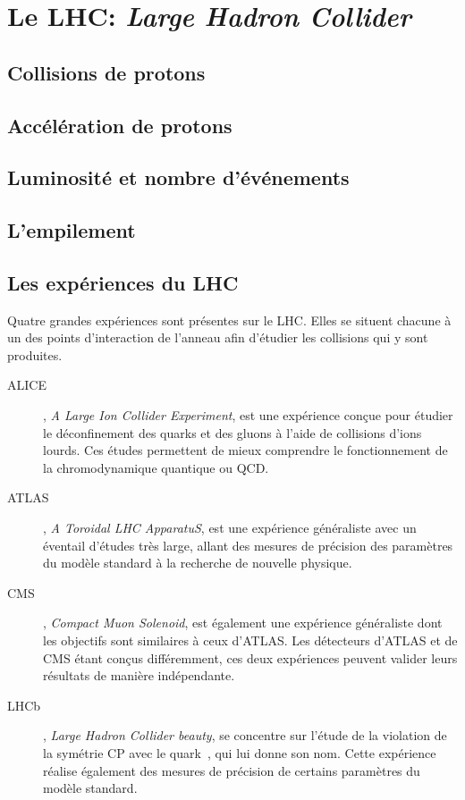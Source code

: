 \section{Le LHC: \emph{Large Hadron Collider}}\label{chapter-LHC-section-LHC}

\subsection{Collisions de protons}\label{chapter-LHC-section-LHC-subsec-pp_collisions}

\subsection{Accélération de protons}\label{chapter-LHC-section-LHC-subsec-pp_acceleration}

\subsection{Luminosité et nombre d'événements}\label{chapter-LHC-section-LHC-subsec-lumi}

\subsection{L'empilement}\label{chapter-LHC-section-LHC-subsec-PU}

\subsection{Les expériences du LHC}\label{chapter-LHC-section-LHC-subsec-experiments}
Quatre grandes expériences sont présentes sur le LHC. Elles se situent chacune à un des points d'interaction de l'anneau afin d'étudier les collisions qui y sont produites.
\begin{description}
\item[ALICE]\cite{alice_paper}, \emph{A Large Ion Collider Experiment}, est une expérience conçue pour étudier le déconfinement des quarks et des gluons à l'aide de collisions d'ions lourds. Ces études permettent de mieux comprendre le fonctionnement de la chromodynamique quantique ou QCD.
\item[ATLAS]\cite{atlas_paper}, \emph{A Toroidal LHC ApparatuS}, est une expérience généraliste avec un éventail d'études très large, allant des mesures de précision des paramètres du modèle standard à la recherche de nouvelle physique.
\item[CMS]\cite{cms_paper}, \emph{Compact Muon Solenoid}, est également une expérience généraliste dont les objectifs sont similaires à ceux d'ATLAS. Les détecteurs d'ATLAS et de CMS étant conçus différemment, ces deux expériences peuvent valider leurs résultats de manière indépendante.
\item[LHCb]\cite{lhcb_paper}, \emph{Large Hadron Collider beauty}, se concentre sur l'étude de la violation de la symétrie CP avec le quark~\quarkb, qui lui donne son nom. Cette expérience réalise également des mesures de précision de certains paramètres du modèle standard.
\end{description}
